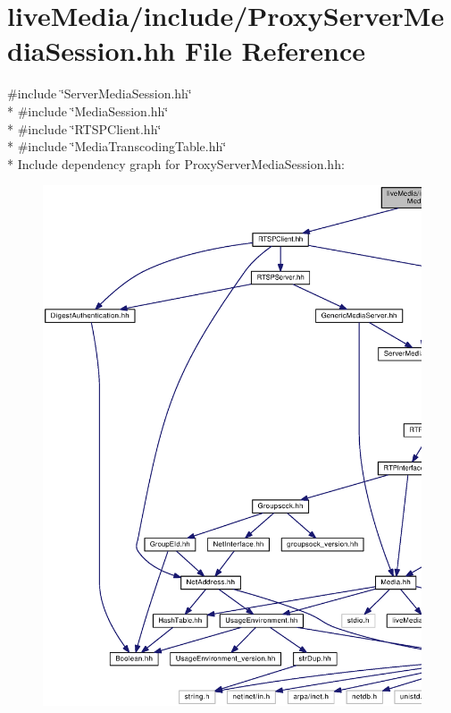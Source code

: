 \section{live\+Media/include/\+Proxy\+Server\+Media\+Session.hh File Reference}
\label{ProxyServerMediaSession_8hh}
{\ttfamily \#include \char`\"{}Server\+Media\+Session.\+hh\char`\"{}}\\*
{\ttfamily \#include \char`\"{}Media\+Session.\+hh\char`\"{}}\\*
{\ttfamily \#include \char`\"{}R\+T\+S\+P\+Client.\+hh\char`\"{}}\\*
{\ttfamily \#include \char`\"{}Media\+Transcoding\+Table.\+hh\char`\"{}}\\*
Include dependency graph for Proxy\+Server\+Media\+Session.\+hh\+:
\nopagebreak
\begin{figure}[H]
\begin{center}
\leavevmode
\includegraphics[width=350pt]{ProxyServerMediaSession_8hh__incl}
\end{center}
\end{figure}
